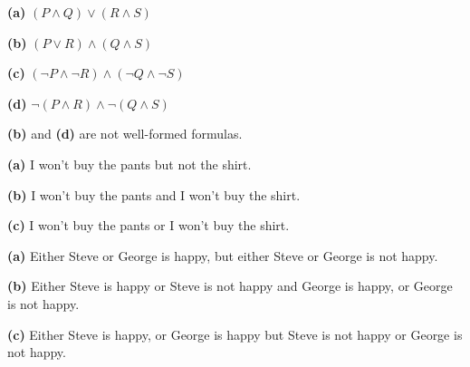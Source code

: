 \sol \textbf{(a)} $(P \land Q) \lor (R \land S)$

\sol \textbf{(b)} $(P \lor R) \land (Q \land S)$

\sol \textbf{(c)} $(\neg P \land \neg R) \land (\neg Q \land \neg S)$

\sol \textbf{(d)} $\neg (P \land R) \land \neg (Q \land S)$


\sol \textbf{(b)} and \textbf{(d)} are not well-formed formulas.


\sol \textbf{(a)} I won't buy the pants but not the shirt. 

\sol \textbf{(b)} I won't buy the pants and I won't buy the shirt.

\sol \textbf{(c)} I won't buy the pants or I won't buy the shirt.


\newpage

\sol \textbf{(a)} Either Steve or George is happy, but either Steve or George is not happy.

\sol \textbf{(b)} Either Steve is happy or Steve is not happy and George is happy, or George is not happy. 

\sol \textbf{(c)} Either Steve is happy, or George is happy but Steve is not happy or George is not happy.


